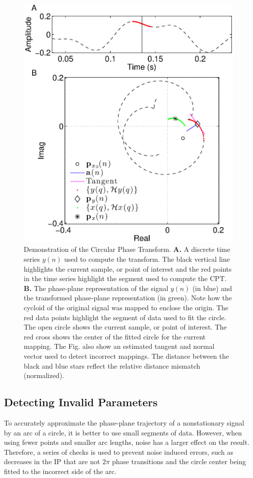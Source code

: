 \documentclass[a4paper]{IEEEtran}
\begin{document}
\begin{figure}
    \centering
    \includegraphics[scale=0.42]{./Figures/MappingDemonstration.eps}
    \caption[MappingDemo]{Demonstration of the Circular Phase Transform. \textbf{A.} A discrete time series $y(n)$ used to compute the transform. The black vertical line highlights the current sample, or point of interest and the red points in the time series highlight the segment used to compute the CPT. \textbf{B.} The phase-plane representation of the signal $y(n)$ (in blue) and the transformed phase-plane representation (in green). Note how the cycloid of the original signal was mapped to enclose the origin. The red data points highlight the segment of data used to fit the circle. The open circle shows the current sample, or point of interest. The red cross shows the center of the fitted circle for the current mapping. The Fig. also show an estimated tangent and normal vector used to detect incorrect mappings. The distance between the black and blue stars reflect the relative distance mismatch (normalized).}
    \label{fig:MappingDemo}
\end{figure}

\subsection{Detecting Invalid Parameters}\label{sect:DetectingInvalidParameters}
To accurately approximate the phase-plane trajectory of a nonstationary signal by an arc of a circle, it is better to use small segments of data. However, when using fewer points and smaller arc lengths, noise has a larger effect on the result. Therefore, a series of checks is used to prevent noise induced errors, such as decreases in the IP that are not $2\pi$ phase transitions and the circle center being fitted to the incorrect side of the arc. 
\end{document}
